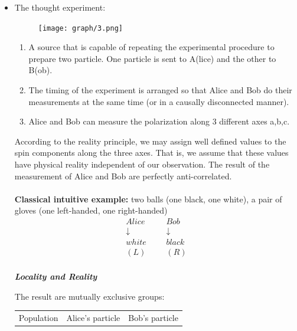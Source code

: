 \documentclass[]{book}
\newtheorem*{remark}{Remark}
\theoremstyle{nonumberplain}
\begin{document}
\begin{itemize}
\begin{remark}
It turns out that Nature experimentally invalidates EPR's points of view, while agreeing with QM. To device Bell's inequality, we should forget about QM for a moment, and use the classical common sense notion of how the world works, the sort of notion EPR thought Nature ought to obey.
\end{remark}
	\item The thought experiment:
\begin{figure}[h]
	\centering
	\texttt{[image: graph/3.png]}
\end{figure}
\begin{enumerate}
	\item A source  that is capable of repeating the experimental procedure to prepare two particle. One particle is sent to A(lice) and the other to B(ob).
	\item The timing of the experiment is arranged so that Alice and Bob do their measurements at the same time (or in a causally disconnected manner). 
	\item Alice and Bob can measure the polarization along 3 different axes a,b,c.
\end{enumerate}
According to the reality principle, we may assign well defined values to the spin components along the three axes. That is, we assume that these values have physical reality independent of our observation. The result of the measurement of Alice and Bob are perfectly anti-correlated.\\
\\
\textbf{Classical intuitive example:} two balls (one black, one white), a pair of gloves (one left-handed, one right-handed)
\begin{equation*}
\begin{aligned}
	Alice &&& Bob \\
	\downarrow &&& \downarrow \\ 
	white &&& black \\
	(L) &&& (R) \\
\end{aligned}
\end{equation*}
\begin{center}
\textit{\textbf{Locality and Reality}}
\end{center}
The result are mutually exclusive groups:
\begin{center}
\begin{tabular}{|c|c|c|}
	\hline
	Population & Alice's particle & Bob's particle \\ 

\end{tabular}
\end{center}
\end{itemize}
\end{document}
